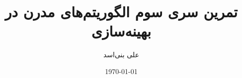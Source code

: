 \documentclass[12pt,onecolumn,a4paper]{article}
\begin{document}
	\title{تمرین سری  سوم الگوریتم‌های مدرن در بهینه‌سازی} 
	\author{علی بنی‌اسد}
	\date{\today}
	\maketitle
	
	
	
\end{document}
